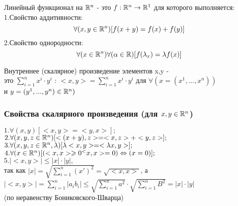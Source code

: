 \begin{opred}
Линейный функционал на $\mathbb{R}^n$ - это $f:\mathbb{R}^n \to \mathbb{R}^1$ для которого выполняется:
\\
1.Свойство аддитивности:
$$
\forall(x,y\in\mathbb{R}^n)[f(x+y)=f(x)+f(y)]
$$
2.Свойство однородности:
$$
\forall(x\in\mathbb{R}^n)\forall(\alpha\in\mathbb{R})[f(\lambda_x)=\lambda f(x)]
$$
\end{opred}

\begin{opred}
	Внутреннее (скалярное) произведение элементов x,y - 
	\\
	это $\sum_{i=1}^{n}x^i\cdot y^i$ : $<x,y>=\sum_{i=1}^{n}x^i\cdot y^i$ для $\forall(x=(x^1,...,x^n))$ 
	\\
	и $y=(y^1,...,y^n)\in\mathbb{R}^n)$
\end{opred}

\subsubsection{Свойства скалярного произведения (для $x,y\in\mathbb{R}^n$)}
$1.\forall(x,y)[<x,y>=<y,x>];$
\\
$2.\forall(x,y,z\in\mathbb{R}^n)[<(x+y),z>=<x,z>+<y,z>];$
\\
$3.\forall(x,y,z\in\mathbb{R}^n,\lambda)[\lambda<x,y>=<\lambda x,y>];$
\\
$4.\forall(x\in\mathbb{R}^n)[(<x,x>\geqslant 0 ^ <x,x>=0)\Leftrightarrow(x=0)];$
\\
$5.|<x,y>|\le |x|\cdot |y| ,$
\\
 так как $|x|=\sqrt{\sum_{i=1}^{n}(x')^2} = \sqrt{<x,x>}$, а 
\\
$
|<x,y>| = \sum_{i=1}^{n} |a_i b_i|\le\sqrt{\sum_{i=1}^{n}a^2}\cdot\sqrt{\sum_{i=1}^{n}B^2}=|x|\cdot |y|
$
\\
(по неравенству Бониковского-Шварца)

